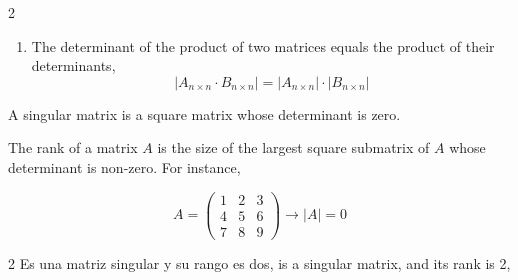 \begin{paracol}{2}
\begin{enumerate}
	\item The determinant of the product of two matrices equals the product of their determinants,
	\begin{equation*}
		\left\vert A_{n\times n} \cdot  B_{n\times n} \right\vert = \left\vert A_{n\times n} \right\vert \cdot \left\vert B_{n\times n} \right\vert 
	\end{equation*}
\end{enumerate}

A singular matrix is a square matrix whose determinant is zero.

The rank of a matrix $A$ is the size of the largest square submatrix of $A$ whose determinant is non-zero. For instance,  
\end{paracol}
\begin{equation*}
A=\begin{pmatrix}
1& 2& 3\\
4& 5& 6\\
7& 8& 9
\end{pmatrix} \rightarrow \vert A \vert =0
\end{equation*}
\begin{paracol}{2}
Es una matriz singular y su rango es dos,
\switchcolumn
is a singular matrix, and its rank is 2,    
\end{paracol}

